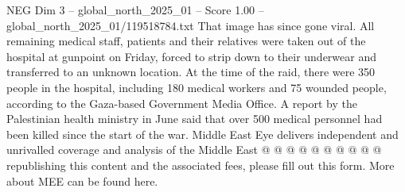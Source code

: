 \begin{textsample}{NEG Dim 3 – global\_north\_2025\_01 – Score 1.00 – global\_north\_2025\_01/119518784.txt}
That image has since gone viral.
All remaining medical staff, patients and their relatives were taken out of the hospital at gunpoint on Friday, forced to strip down to their underwear and transferred to an unknown location.
At the time of the raid, there were 350 people in the hospital, including 180 medical workers and 75 wounded people, according to the Gaza-based Government Media Office.
A report by the Palestinian health ministry in June said that over 500 medical personnel had been killed since the start of the war.
Middle East Eye delivers independent and unrivalled coverage and analysis of the Middle East @ @ @ @ @ @ @ @ @ @ republishing this content and the associated fees, please fill out this form.
More about MEE can be found here.

\end{textsample}
